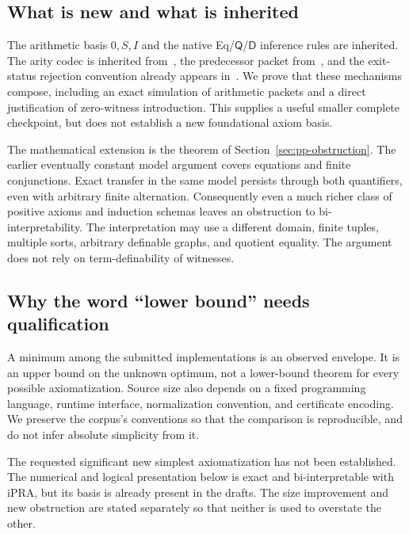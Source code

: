 \documentclass[11pt,letterpaper]{article}
\theoremstyle{definition}\newtheorem{definition}[theorem]{Definition}
\theoremstyle{remark}\newtheorem{remark}[theorem]{Remark}
\newcommand{\D}{\mathsf D}
\newcommand{\Q}{\mathsf Q}
\begin{document}
\subsection{What is new and what is inherited}

The arithmetic basis $0,S,I$ and the native Eq/$\Q$/$\D$ inference
rules are inherited. The arity codec is inherited from~\cite{arity},
the predecessor packet from~\cite{uniform}, and the exit-status
rejection convention already appears in~\cite{uniform}. We prove that
these mechanisms compose, including an exact simulation of arithmetic
packets and a direct justification of zero-witness introduction.
This supplies a useful smaller complete checkpoint, but does not
establish a new foundational axiom basis.

The mathematical extension is the theorem of
Section~\ref{sec:pp-obstruction}. The earlier eventually constant model
argument covers equations and finite conjunctions. Exact transfer in
the same model persists through both quantifiers, even with arbitrary
finite alternation. Consequently even a much richer class of positive
axioms and induction schemas leaves an obstruction to
bi-interpretability. The interpretation may use a different domain,
finite tuples, multiple sorts, arbitrary definable graphs, and quotient
equality. The argument does not rely on term-definability of witnesses.

\subsection{Why the word ``lower bound'' needs qualification}

A minimum among the submitted implementations is an observed envelope.
It is an upper bound on the unknown optimum, not a lower-bound theorem
for every possible axiomatization. Source size also depends on a fixed
programming language, runtime interface, normalization convention, and
certificate encoding. We preserve the corpus's conventions so that the
comparison is reproducible, and do not infer absolute simplicity from it.

The requested significant new simplest axiomatization has not been
established. The numerical and logical presentation below is exact and
bi-interpretable with iPRA, but its basis is already present in the
drafts. The size improvement and new obstruction are stated separately
so that neither is used to overstate the other.



\end{document}
